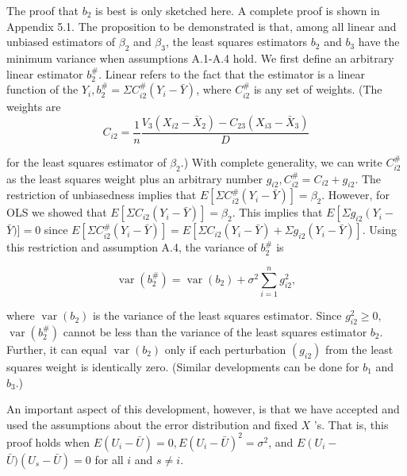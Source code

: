\documentclass[
  10pt,
  letterpaper,
  a4paper, twoside]{scrreprt}
\begin{document}
\begin{tcolorbox}[enhanced jigsaw, coltitle=black, opacitybacktitle=0.6, toptitle=1mm, colbacktitle=quarto-callout-warning-color!10!white, colback=white, toprule=.15mm, opacityback=0, bottomrule=.15mm, arc=.35mm, colframe=quarto-callout-warning-color-frame, leftrule=.75mm, titlerule=0mm, breakable, left=2mm, rightrule=.15mm, title={IYI (∉ Klausur): Herleitung, wann OLS ``Best'' ist}, bottomtitle=1mm]

The proof that \(b_2\) is best is only sketched here. A complete proof
is shown in Appendix 5.1. The proposition to be demonstrated is that,
among all linear and unbiased estimators of \(\beta_2\) and \(\beta_3\),
the least squares estimators \(b_2\) and \(b_3\) have the minimum
variance when assumptions A.1-A.4 hold. We first define an arbitrary
linear estimator \(b_2^{\#}\). Linear refers to the fact that the
estimator is a linear function of the
\(Y_i, b_2^{\#}=\Sigma C_{i 2}^{\#}\left(Y_i-\bar{Y}\right)\), where
\(C_{i 2}^{\#}\) is any set of weights. (The weights are \[
C_{i 2}=\frac{1}{n} \frac{V_3\left(X_{i 2}-\bar{X}_2\right)-C_{23}\left(X_{i 3}-\bar{X}_3\right)}{D}
\]

for the least squares estimator of \(\beta_2\).) With complete
generality, we can write \(C_{i 2}^{\#}\) as the least squares weight
plus an arbitrary number \(g_{i 2}, C_{i 2}^{\#}=C_{i 2}+g_{i 2}\). The
restriction of unbiasedness implies that
\(E\left[\Sigma C_{i 2}^{\#}\left(Y_i-\bar{Y}\right)\right]=\beta_2\).
However, for OLS we showed that
\(E\left[\Sigma C_{i 2}\left(Y_i-\bar{Y}\right)\right]=\beta_2\). This
implies that \(E\left[\Sigma g_{i 2}\left(Y_i-\right.\right.\)
\(\bar{Y})]=0\) since
\(E\left[\Sigma C_{i 2}^{\#}\left(Y_i-\bar{Y}\right)\right]=E\left[\Sigma C_{i 2}\left(Y_i-\bar{Y}\right)+\Sigma g_{i 2}\left(Y_i-\bar{Y}\right)\right]\).
Using this restriction and assumption A.4, the variance of \(b_2^{\#}\)
is

\[
\operatorname{var}\left(b_2^{\#}\right)=\operatorname{var}\left(b_2\right)+\sigma^2 \sum_{i=1}^n g_{i 2}^2,
\]

where \(\operatorname{var}\left(b_2\right)\) is the variance of the
least squares estimator. Since \(g_{i 2}^2 \geqslant 0\),
\(\operatorname{var}\left(b_2^{\#}\right)\) cannot be less than the
variance of the least squares estimator \(b_2\). Further, it can equal
\(\operatorname{var}\left(b_2\right)\) only if each perturbation
\(\left(g_{i 2}\right)\) from the least squares weight is identically
zero. (Similar developments can be done for \(b_1\) and \(b_3\).)

An important aspect of this development, however, is that we have
accepted and used the assumptions about the error distribution and fixed
\(X\) 's. That is, this proof holds when
\(E\left(U_i-\bar{U}\right)=0, E\left(U_i-\bar{U}\right)^2=\sigma^2\),
and \(E\left(U_i-\right.\) \(\bar{U})\left(U_s-\bar{U}\right)=0\) for
all \(i\) and \(s \neq i\).

\end{tcolorbox}
\end{document}
